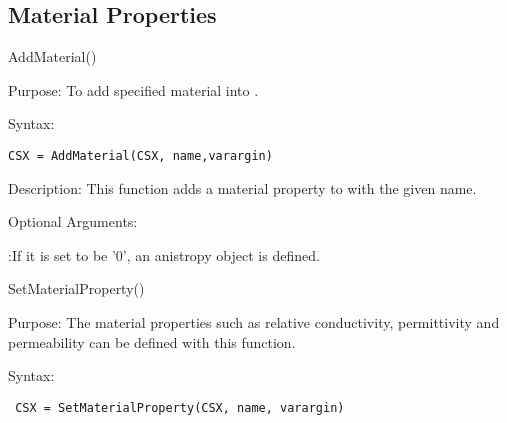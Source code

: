 \subsection{Material Properties}\label{subsection_material_prop}

\begin{FontNameFunct}{AddMaterial()}
\end{FontNameFunct}

\begin{FontDescr}{Purpose:}
 To add specified material into \hyperref[CSX]{}.
\end{FontDescr}

\begin{FontDescr}{Syntax:}
 \begin{lstlisting}
CSX = AddMaterial(CSX, name,varargin)
 \end{lstlisting}
\end{FontDescr}

\begin{FontDescr}{Description:}
  This function adds a material property to \hyperref[CSX]{} with the given name.
\end{FontDescr}
\begin{FontDescr}{Optional Arguments:}
\begin{myindentpar} 
   :If it is set to be '0', an anistropy object is defined. 
\end{myindentpar}  
\end{FontDescr}


\begin{FontNameFunct}{SetMaterialProperty()}
 \end{FontNameFunct}
\begin{FontDescr}{Purpose:}
The material properties such as relative conductivity, permittivity and permeability can be defined with this function.
\end{FontDescr}

 \begin{FontDescr}{Syntax:}
  \begin{lstlisting}
 CSX = SetMaterialProperty(CSX, name, varargin)
  \end{lstlisting}
 \end{FontDescr}
  
 
